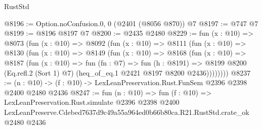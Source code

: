 \begin{lexlean}{RustStd}
\begin{coremodule}
@8196 := Option.noConfusion.{0, 0} (@2401 (@8056 @870)) @7
@8197 := @747 @7
@8199 := @8196 @8197 @7
@8200 := @2435 @2480
@8229 := fun (x : @10) =>
  @8073
    (fun (x : @10) =>
    @8092
      (fun (x : @10) =>
      @8111
        (fun (x : @10) =>
        @8130
          (fun (x : @10) =>
          @8149
            (fun (x : @10) =>
            @8168
              (fun (x : @10) =>
              @8187
                (fun (x : @10) =>
                fun (fn : @7) =>
                fun (h : @8191) =>
                @8199 @8200 (Eq.refl.{2} (Sort 1) @7) (heq_of_eq.{1} @2421 @8197 @8200 @2436))))))))
@8237 := (n : @10) -> (f : @10) -> LexLeanPreservation.Rust.FunSem @2396 @2398 @2400 @2480 @2436
@8247 := fun (n : @10) =>
  fun (f : @10) =>
  LexLeanPreservation.Rust.simulate
    @2396
    @2398
    @2400
    LexLeanPreserve.Cdebed7637d9c49a55a964ed0b66b80ca.R21.RustStd.crate_ok
    @2480
    @2436
\end{coremodule}
\end{lexlean}
